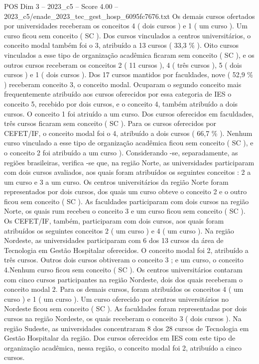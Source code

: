 \begin{textsample}{POS Dim 3 – 2023\_c5 – Score 4.00 – 2023\_c5/enade\_2023\_tec\_gest\_hosp\_6095fc7676.txt}
Os demais cursos ofertados por universidades receberam os conceitos 4 ( dois cursos ) e 1 ( um curso ).
Um curso ficou sem conceito ( SC ).
Dos cursos vinculados a centros universitários, o conceito modal também foi o 3, atribuído a 13 cursos ( 33,3 \% ).
Oito cursos vinculados a esse tipo de organização acadêmica ficaram sem conceito ( SC ), e os outros cursos receberam os conceitos 2 ( 11 cursos ), 4 ( três cursos ), 5 ( dois cursos ) e 1 ( dois cursos ).
Dos 17 cursos mantidos por faculdades, nove ( 52,9 \% ) receberam conceito 3, o conceito modal.
Ocuparam o segundo conceito mais frequentemente atribuído aos cursos oferecidos por essa categoria de IES o conceito 5, recebido por dois cursos, e o conceito 4, também atribuído a dois cursos.
O conceito 1 foi atriuído a um curso.
Dos cursos oferecidos em faculdades, três cursos ficaram sem conceito ( SC ).
Para os cursos oferecidos por CEFET/IF, o conceito modal foi o 4, atribuído a dois cursos ( 66,7 \% ).
Nenhum curso vinculado a esse tipo de organização acadêmica ficou sem conceito ( SC ), e o conceito 2 foi atribuído a um curso ).
Considerando -se, separadamente, as regiões brasileiras, verifica -se que, na região Norte, as universidades participaram com dois cursos avaliados, aos quais foram atribuídos os seguintes conceitos : 2 a um curso e 3 a um curso.
Os centros universitários da região Norte foram representados por dois cursos, dos quais um curso obteve o conceito 2 e o outro ficou sem conceito ( SC ).
As faculdades participaram com dois cursos na região Norte, os quais rum recebeu o conceito 3 e um curso ficou sem conceito ( SC ).
Os CEFET/IF, também, participaram com dois cursos, aos quais foram atribuídos os seguintes conceitos 2 ( um curso ) e 4 ( um curso ).
Na região Nordeste, as universidades participaram com 6 dos 13 cursos da área de Tecnologia em Gestão Hospitalar oferecidos.
O conceito modal foi 2, atribuído a três cursos.
Outros dois cursos obtiveram o conceito 3 ; e um curso, o conceito 4.Nenhum curso ficou sem conceito ( SC ).
Os centros universitários contaram com cinco cursos participantes na região Nordeste, dois dos quais receberam o conceito modal 2.
Para os demais cursos, foram atribuídos os conceitos 4 ( um curso ) e 1 ( um curso ).
Um curso oferecido por centros universitários no Nordeste ficou sem conceito ( SC ).
As faculdades foram representadas por dois cursos na região Nordeste, os quais receberam o conceito 3 ( dois cursos ).
Na região Sudeste, as universidades concentraram 8 dos 28 cursos de Tecnologia em Gestão Hospitalar da região.
Dos cursos oferecidos em IES com este tipo de organização acadêmica, nessa região, o conceito modal foi 2, atribuído a cinco cursos.

\end{textsample}
